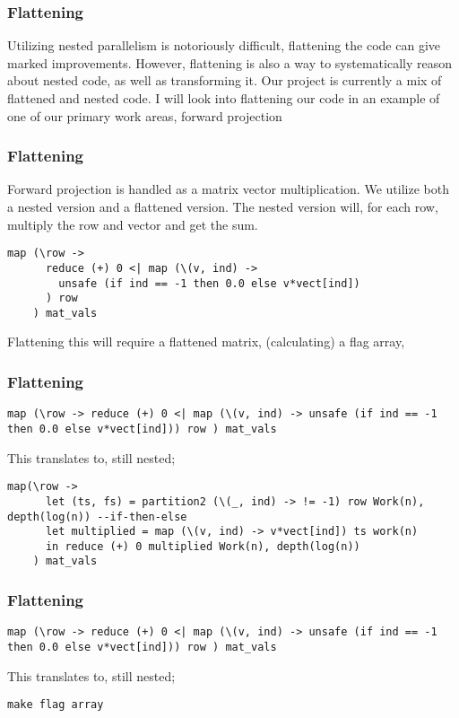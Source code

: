 \documentclass{beamer}
\begin{document}
\begin{frame}
  \frametitle{Flattening}
  Utilizing nested parallelism is notoriously difficult, flattening the code can give marked improvements. However, flattening is also a way to systematically reason about nested code, as well as transforming it. Our project is currently a mix of flattened and nested code.\newline
  \newline
  I will look into flattening our code in an example of one of our primary work areas, forward projection
\end{frame}

\begin{frame}[fragile]
  \frametitle{Flattening}
  Forward projection is handled as a matrix vector multiplication. We utilize both a nested version and a flattened version. %
  The nested version will, for each row, multiply the row and vector and get the sum.
  \begin{lstlisting}[frame=single, language=Futhark]
    map (\row ->
      reduce (+) 0 <| map (\(v, ind) ->
        unsafe (if ind == -1 then 0.0 else v*vect[ind])
      ) row
    ) mat_vals
  \end{lstlisting}
  Flattening this will require a flattened matrix, (calculating) a flag array,
\end{frame}

\begin{frame}[fragile]
  \frametitle{Flattening}
  \begin{lstlisting}[frame=single, language=Futhark]
    map (\row -> reduce (+) 0 <| map (\(v, ind) -> unsafe (if ind == -1 then 0.0 else v*vect[ind])) row ) mat_vals
  \end{lstlisting}
  This translates to, still nested;
  \begin{lstlisting}[frame=single, language=Futhark]
    map(\row ->
      let (ts, fs) = partition2 (\(_, ind) -> != -1) row Work(n), depth(log(n)) --if-then-else
      let multiplied = map (\(v, ind) -> v*vect[ind]) ts work(n)
      in reduce (+) 0 multiplied Work(n), depth(log(n))
    ) mat_vals
  \end{lstlisting}
\end{frame}

\begin{frame}[fragile]
  \frametitle{Flattening}
  \begin{lstlisting}[frame=single, language=Futhark]
    map (\row -> reduce (+) 0 <| map (\(v, ind) -> unsafe (if ind == -1 then 0.0 else v*vect[ind])) row ) mat_vals
  \end{lstlisting}
  This translates to, still nested;
  \begin{lstlisting}[frame=single, language=Futhark]
    make flag array

  \end{lstlisting}
\end{frame}
\end{document}
